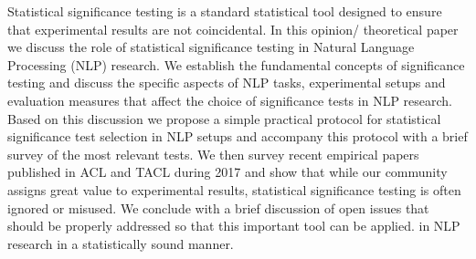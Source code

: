 Statistical significance testing is a standard statistical tool designed to ensure that experimental results are not coincidental. In this opinion/ theoretical paper we discuss the role of statistical significance testing in Natural Language Processing (NLP) research. We establish the fundamental concepts of significance testing and discuss the specific aspects of NLP tasks, experimental setups and evaluation measures that affect the choice of significance tests in NLP research. Based on this discussion we propose a simple practical protocol for statistical significance test selection in NLP setups and accompany this protocol with a brief survey of the most relevant tests. We then survey recent empirical papers published in ACL and TACL during 2017 and show that while our community assigns great value to experimental results, statistical significance testing is often ignored or misused. We conclude with a brief discussion of open issues that should be properly addressed so that this important tool can be applied. in NLP research in a statistically sound manner.
